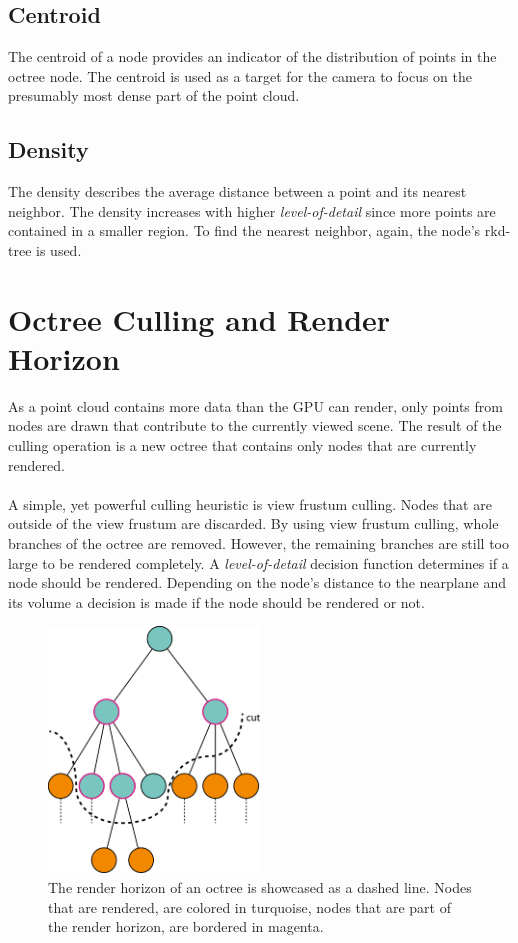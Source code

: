 \subsection{Centroid}

The centroid of a node provides an indicator of the distribution of points in the octree node. The centroid is used as a target for the camera to focus on the presumably most dense part of the point cloud. 


\subsection{Density}

The density describes the average distance between a point and its nearest neighbor. The density increases with higher \textit{level-of-detail} since more points are contained in a smaller region. To find the nearest neighbor, again, the node's rkd-tree is used. 


\section{Octree Culling and Render Horizon}
\label{sec:renderHorizon}

As a point cloud contains more data than the GPU can render, only points from nodes are drawn that contribute to the currently viewed scene. The result of the culling operation is a new octree that contains only nodes that are currently rendered. 
\\
\\
A simple, yet powerful culling heuristic is view frustum culling. Nodes that are outside of the view frustum are discarded. By using view frustum culling, whole branches of the octree are removed. However, the remaining branches are still too large to be rendered completely. A \textit{level-of-detail} decision function determines if a node should be rendered. Depending on the node's distance to the nearplane and its volume a decision is made if the node should be rendered or not. 

\begin{figure}
    \centering
    \includegraphics[width=0.5\textwidth]{Octree/renderHorizon.png}
    \caption[Illustration of the render horizon of an octree.]
		{The render horizon of an octree is showcased as a dashed line. Nodes that are rendered, are colored in turquoise, nodes that are part of the render horizon, are bordered in magenta. }
    \label{fig:renderHorizon}
\end{figure}


